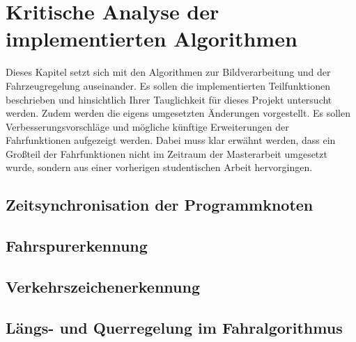 \chapter{Kritische Analyse der implementierten Algorithmen} \label{cha:AnalyseAlgorithmen}
Dieses Kapitel setzt sich mit den Algorithmen zur Bildverarbeitung und der Fahrzeugregelung auseinander. Es sollen die implementierten Teilfunktionen beschrieben und hinsichtlich Ihrer Tauglichkeit für dieses Projekt untersucht werden. Zudem werden die eigens umgesetzten Änderungen vorgestellt. Es sollen Verbesserungsvorschläge und mögliche künftige Erweiterungen der Fahrfunktionen aufgezeigt werden. 
Dabei muss klar erwähnt werden, dass ein Großteil der Fahrfunktionen nicht im Zeitraum der Masterarbeit umgesetzt wurde, sondern aus einer vorherigen studentischen Arbeit \cite{Fitzer.31.03.2018} hervorgingen. 

\section{Zeitsynchronisation der Programmknoten} \label{sec:Zeitsynchronisation}

\section{Fahrspurerkennung}  \label{sec:Fahrspurerkennung}

\section{Verkehrszeichenerkennung} \label{sec:Verkehrszeichenerkennung}

\section{Längs- und Querregelung im Fahralgorithmus} \label{sec:Fahralgorithmus}
